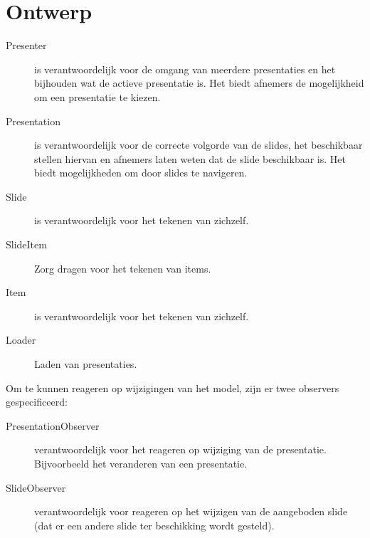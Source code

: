 \documentclass[a4paper]{article}
\begin{document}
\section{Ontwerp}
\begin{description}
\item[Presenter] is verantwoordelijk voor de omgang van meerdere presentaties en het bijhouden wat de actieve presentatie is. Het biedt afnemers de mogelijkheid om een presentatie te kiezen.
\item[Presentation] is verantwoordelijk voor de correcte volgorde van de slides, het beschikbaar stellen hiervan en afnemers laten weten dat de slide beschikbaar is. Het biedt mogelijkheden om door slides te navigeren.
\item[Slide] is verantwoordelijk voor het tekenen van zichzelf.
\item[SlideItem] Zorg dragen voor het tekenen van items.
\item[Item] is verantwoordelijk voor het tekenen van zichzelf.
\item[Loader] Laden van presentaties.
\end{description}
Om te kunnen reageren op wijzigingen van het model, zijn er twee observers gespecificeerd:
\begin{description}
\item[PresentationObserver] verantwoordelijk voor het reageren op wijziging van de presentatie. Bijvoorbeeld het veranderen van een presentatie.
\item[SlideObserver] verantwoordelijk voor reageren op het wijzigen van de aangeboden slide (dat er een andere slide ter beschikking wordt gesteld).
\end{description}
\end{document}
